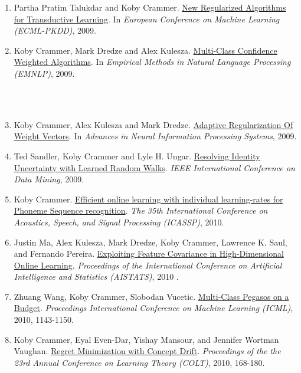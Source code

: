 \documentclass{resume}
\newcommand{\technion}{~Position at TECHNION~}
\begin{document}
\begin{enumerate}
\item
Partha Pratim Talukdar and {Koby Crammer}.
\href{http://www.cis.upenn.edu/~crammer/publications/adsorption_ecml09.pdf}{New Regularized Algorithms for Transductive Learning}.
In {\em European Conference on Machine Learning (ECML-PKDD)}, 2009.
\item
{Koby Crammer}, Mark Dredze and Alex Kulesza.
\href{http://www.cis.upenn.edu/~crammer/publications/mccw_emnlp09.pdf}{Multi-Class Confidence Weighted Algorithms}.
In {\em Empirical Methods in Natural Language Processing (EMNLP)},
2009.
\\~\\\centerline{\hrulefill\raisebox{-0.5\ht1}{\technion}\hrulefill}\\

\item
{Koby Crammer}, Alex Kulesza and Mark Dredze.
\href{http://webee.technion.ac.il/people/koby/publications/arow_nips09.pdf}{Adaptive Regularization Of Weight Vectors}.
In {\em Advances in Neural Information Processing Systems}, 2009.
\item
Ted Sandler, {Koby Crammer} and Lyle H. Ungar.
\href{http://webee.technion.ac.il/people/koby/publications/icdm2009_PID1023443.pdf}{Resolving Identity Uncertainty with Learned Random Walks}.
{\em IEEE International Conference on Data Mining}, 2009.

\item {Koby Crammer}.
\href{http://webee.technion.ac.il/people/koby/publications/icassp10.pdf}{Efficient online learning with individual learning-rates for Phoneme Sequence recognition}.
{\em The 35th International Conference on Acoustics, Speech, and Signal Processing (ICASSP)}, 2010.

\item Justin Ma, Alex Kulesza, Mark Dredze, {Koby Crammer}, Lawrence K. Saul, and Fernando Pereira.
\href{http://webee.technion.ac.il/people/koby/publications/covariance-aistats2010.pdf}{Exploiting Feature Covariance in High-Dimensional Online Learning}.
{\em Proceedings of the International Conference on Artificial Intelligence and Statistics (AISTATS)}, 2010 .


\item
Zhuang Wang, Koby Crammer, Slobodan Vucetic.
\href{http://webee.technion.ac.il/people/koby/publications/ICML10_BPegasos.pdf}{Multi-Class Pegasos on a Budget}.
{\em Proceedings International Conference on Machine Learning (ICML)}, 2010, 1143-1150.

\item {Koby Crammer}, Eyal Even-Dar, Yishay Mansour, and Jennifer Wortman Vaughan.
\href{http://webee.technion.ac.il/people/koby/publications/conceptdrift.pdf}{Regret Minimization with Concept Drift}.
{\em Proceedings of the the 23rd Annual Conference on Learning Theory
  (COLT)}, 2010, 168-180.





\end{enumerate}
\end{document}
